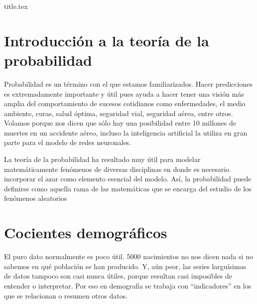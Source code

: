 \documentclass[a4paper,11pt]{book}
\begin{document}
\frontmatter
{title.tex}

\clearpage
\thispagestyle{empty}

\tableofcontents

\mainmatter
\chapter{Introducción a la teoría de la probabilidad}
    Probabilidad es un término con el que estamos familiarizados. Hacer predicciones es extremadamente importante y útil pues ayuda a hacer tener una visión más amplia del comportamiento de sucesos cotidianos como enfermedades, el medio ambiente, curas, salud óptima, seguridad vial, seguridad aérea, entre otros.
    Volamos porque nos dicen que sólo hay una posibilidad entre 10 millones de muertes en un accidente aéreo, incluso la inteligencia artificial la utiliza en gran parte para el modelo de redes neuronales.
    
    La teoría de la probabilidad ha resultado muy útil para modelar
    matemáticamente fenómenos de diversas disciplinas en donde es necesario incorporar el azar como elemento esencial del modelo. Así, la probabilidad puede definirse como
    aquella rama de las matemáticas que se encarga del estudio de los fenómenos aleatorios
    
    
    
    
    
    

\chapter{Cocientes demográficos}
    El puro dato normalmente es poco útil. 5000 nacimientos no nos dicen nada si no sabemos en qué población se han producido. Y, aún peor, las series larguísimas de datos tampoco son casi nunca útiles, porque resultan casi imposibles de entender o interpretar. Por eso en demografía se trabaja con “indicadores” en los que se relacionan o resumen otros datos.
    
    
\end{document}
